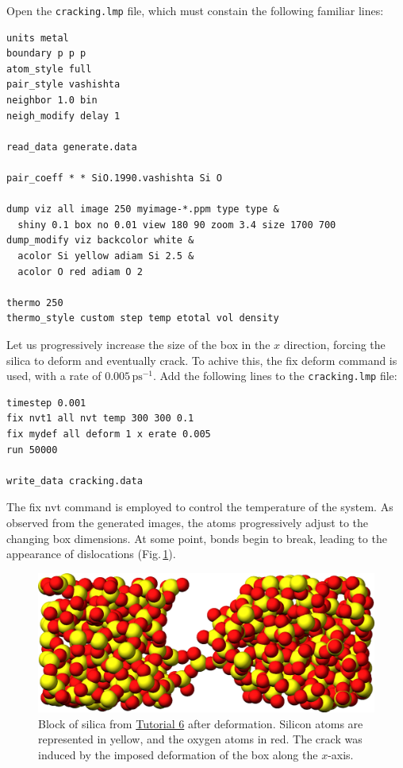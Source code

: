 \documentclass[9pt,tutorial]{livecoms}
\newcommand{\lmpcmd}[1]{\hspace{0pt}\colorbox{listing}{\textcolor{command}{\small{#1}}}\hspace{0pt}} %
\newcommand{\flecmd}[1]{\textcolor{command}{\texttt{#1}}} %
\begin{document}
Open the \flecmd{cracking.lmp} file, which must constain the following familiar lines:
\begin{lstlisting}
units metal
boundary p p p
atom_style full
pair_style vashishta
neighbor 1.0 bin
neigh_modify delay 1

read_data generate.data

pair_coeff * * SiO.1990.vashishta Si O

dump viz all image 250 myimage-*.ppm type type &
  shiny 0.1 box no 0.01 view 180 90 zoom 3.4 size 1700 700
dump_modify viz backcolor white &
  acolor Si yellow adiam Si 2.5 &
  acolor O red adiam O 2

thermo 250
thermo_style custom step temp etotal vol density
\end{lstlisting}

Let us progressively increase the size of the box in the $x$ direction,
forcing the silica to deform and eventually crack.  To achive this,
the \lmpcmd{fix deform} command is used, with a rate
of $0.005\,\text{ps}^{-1}$.  Add the following lines to
the \flecmd{cracking.lmp} file:
\begin{lstlisting}
timestep 0.001
fix nvt1 all nvt temp 300 300 0.1
fix mydef all deform 1 x erate 0.005
run 50000

write_data cracking.data
\end{lstlisting}
The \lmpcmd{fix nvt} command is employed to control the temperature of the system.
As observed from the generated images, the atoms
progressively adjust to the changing box dimensions. At some point, bonds begin to break,
leading to the appearance of dislocations (Fig.\,\ref{fig:GCMC-cracked}).

\begin{figure}
\centering
\includegraphics[width=\linewidth]{GCMC-cracked}
\caption{Block of silica from \hyperref[gcmc-silica-label]{Tutorial 6}
after deformation.  Silicon atoms are represented in yellow,
and the oxygen atoms in red.  The crack was induced by the
imposed deformation of the box along the $x$-axis.}
\label{fig:GCMC-cracked}
\end{figure}
\end{document}
